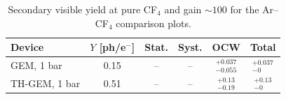 \begin{table}[htbp]
\centering
\caption{Secondary visible yield at pure CF$_4$ and gain $\sim 100$ for the Ar--CF$_4$ comparison plots.}
\label{tab:secondary_comparation_pure_cf4_gain100}
\begin{tabular}{lccccc}
\toprule
Device & $Y$ [ph/e$^-$] & Stat. & Syst. & OCW & Total \\
\midrule
GEM, 1 bar & \num{0.15} & -- & -- & $^{+\num{0.037}}_{-\num{0.055}}$ & $^{+\num{0.037}}_{-\num{0}}$ \\
TH-GEM, 1 bar & \num{0.51} & -- & -- & $^{+\num{0.13}}_{-\num{0.19}}$ & $^{+\num{0.13}}_{-\num{0}}$ \\
\bottomrule
\end{tabular}
\end{table}